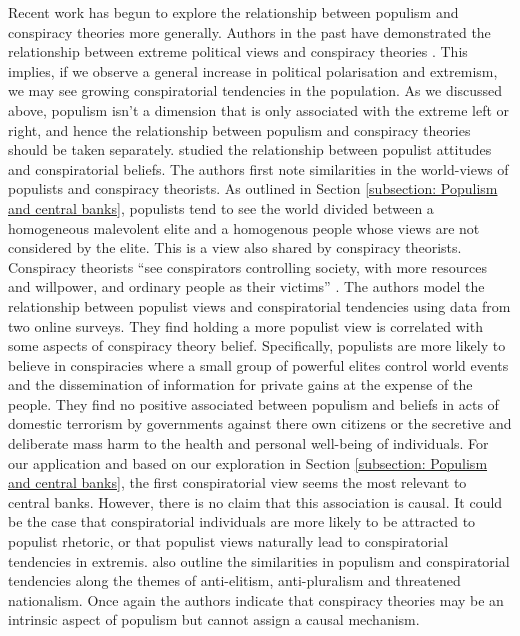 \documentclass[11pt]{article}
\begin{document}
Recent work has begun to explore the relationship between populism and conspiracy theories more generally. Authors in the past have demonstrated the relationship between extreme political views and conspiracy theories \citep{van2015political}. This implies, if we observe a general increase in political polarisation and extremism, we may see growing conspiratorial tendencies in the population. As we discussed above, populism isn't a dimension that is only associated with the extreme left or right, and hence the relationship between populism and conspiracy theories should be taken separately. \cite{castanho2017elite} studied the relationship between populist attitudes and conspiratorial beliefs. The authors first note similarities in the world-views of populists and conspiracy theorists. As outlined in Section \ref{subsection: Populism and central banks}, populists tend to see the world divided between a homogeneous malevolent elite and a homogenous people whose views are not considered by the elite. This is a view also shared by conspiracy theorists. Conspiracy theorists ``see conspirators controlling society, with more resources and willpower, and ordinary people as their victims'' \citep[pg.~427]{castanho2017elite}. The authors model the relationship between populist views and conspiratorial tendencies using data from two online surveys. They find holding a more populist view is correlated with some aspects of conspiracy theory belief. Specifically, populists are more likely to believe in conspiracies where a small group of powerful elites control world events and the dissemination of information for private gains at the expense of the people. They find no positive associated between populism and beliefs in acts of domestic terrorism by governments against there own citizens or the secretive and deliberate mass harm to the health and personal well-being of individuals. For our application and based on our exploration in Section \ref{subsection: Populism and central banks}, the first conspiratorial view seems the most relevant to central banks. However, there is no claim that this association is causal. It could be the case that conspiratorial individuals are more likely to be attracted to populist rhetoric, or that populist views naturally lead to conspiratorial tendencies in extremis. \cite{van2018populism} also outline the similarities in populism and conspiratorial tendencies along the themes of anti-elitism, anti-pluralism and threatened nationalism. Once again the authors indicate that conspiracy theories may be an intrinsic aspect of populism but cannot assign a causal mechanism.
\end{document}
